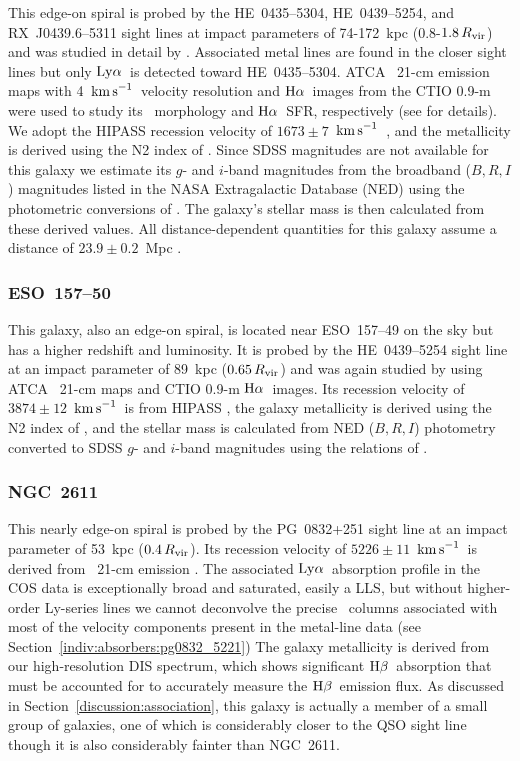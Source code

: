 \documentclass[twocolumn,twocolappendix,tighten,times]{aastex6}
\newcommand{\HI}{\ion{H}{1}}
\newcommand{\Ha}{\ensuremath{{\rm H}\alpha}}
\newcommand{\Hb}{\ensuremath{{\rm H}\beta}}
\newcommand{\kms}{\ensuremath{{\rm km\,s}^{-1}}}
\newcommand{\lya}{\ensuremath{{\rm Ly}\alpha}}
\begin{document}
This edge-on spiral is probed by the HE~0435--5304, HE~0439--5254, and
RX~J0439.6--5311 sight lines at impact parameters of 74-172~kpc
(0.8-$1.8\,R_{\rm vir}$) and was studied in detail by
\citet{keeney13}.  Associated metal lines are found in the closer
sight lines but only  \lya\ is detected toward HE~0435--5304. ATCA
\HI\ 21-cm emission maps  with 4~\kms\ velocity resolution and \Ha\
images from the CTIO 0.9-m were used to study its \HI\ morphology and
\Ha\ SFR, respectively (see \citealp{keeney13} for details). We adopt
the HIPASS recession velocity of  $1673\pm7$~\kms\ \citep{meyer04},
and the metallicity is derived using the N2 index of
\citet{pettini04}. Since SDSS magnitudes are not available  for this
galaxy we estimate its $g$- and $i$-band magnitudes from the broadband
($B,R,I$) magnitudes listed in the NASA Extragalactic Database (NED)
using the photometric conversions of \citet{jester05}. The  galaxy's
stellar mass is then calculated from these derived values. All
distance-dependent quantities  for this galaxy assume a distance of
$23.9\pm0.2$~Mpc \citep{willick97,tully09}.


\subsubsection{ESO~157--50}
\label{indiv:galaxies:eso157-50}

This galaxy, also an edge-on spiral, is located near ESO~157--49 on
the sky but has a higher redshift and luminosity. It is probed by the
HE~0439--5254 sight line at an impact parameter of 89~kpc
($0.65\,R_{\rm vir}$) and was again studied by \citet{keeney13} using
ATCA \HI\ 21-cm maps and CTIO 0.9-m \Ha\ images. Its  recession
velocity of $3874\pm12$~\kms\ is from HIPASS \citep{meyer04}, the
galaxy metallicity is derived using the N2 index of \citet{pettini04},
and the  stellar mass is calculated from NED ($B,R,I$) photometry
converted to SDSS $g$-  and $i$-band magnitudes using the relations of
\citet{jester05}. 


\subsubsection{NGC~2611}
\label{indiv:galaxies:ngc2611}

This nearly edge-on spiral is probed by the PG~0832+251 sight line at an impact 
parameter of 53~kpc ($0.4\,R_{\rm vir}$).  Its recession velocity of 
$5226\pm11$~\kms\ is derived from \HI\ 21-cm emission \citep{springob05}. 
The associated \lya\ absorption profile in the COS data is exceptionally broad 
and saturated, easily a LLS, but without higher-order Ly-series lines we
cannot deconvolve the precise \HI\ columns associated with most of
the velocity components present in the metal-line data (see
Section~\ref{indiv:absorbers:pg0832_5221}) The galaxy metallicity
is derived from our high-resolution DIS spectrum, which shows significant
\Hb\ absorption that must be accounted for to accurately measure
the \Hb\ emission flux. As discussed in Section~\ref{discussion:association}, 
this galaxy is actually a member of a small group of galaxies, one of which is 
considerably closer to the QSO sight line though it is also considerably fainter 
than NGC~2611.
\end{document}
